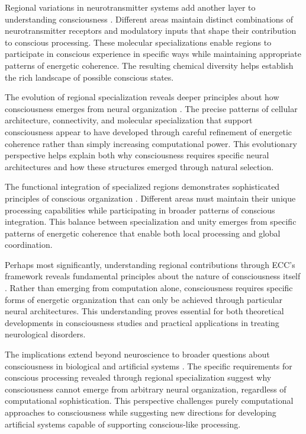 Regional variations in neurotransmitter systems add another layer to understanding consciousness \cite{Tononi2016}. Different areas maintain distinct combinations of neurotransmitter receptors and modulatory inputs that shape their contribution to conscious processing. These molecular specializations enable regions to participate in conscious experience in specific ways while maintaining appropriate patterns of energetic coherence. The resulting chemical diversity helps establish the rich landscape of possible conscious states.

The evolution of regional specialization reveals deeper principles about how consciousness emerges from neural organization \cite{Yu2015}. The precise patterns of cellular architecture, connectivity, and molecular specialization that support consciousness appear to have developed through careful refinement of energetic coherence rather than simply increasing computational power. This evolutionary perspective helps explain both why consciousness requires specific neural architectures and how these structures emerged through natural selection.

The functional integration of specialized regions demonstrates sophisticated principles of conscious organization \cite{Schmahmann2019}. Different areas must maintain their unique processing capabilities while participating in broader patterns of conscious integration. This balance between specialization and unity emerges from specific patterns of energetic coherence that enable both local processing and global coordination.

Perhaps most significantly, understanding regional contributions through ECC's framework reveals fundamental principles about the nature of consciousness itself \cite{Vogt2005}. Rather than emerging from computation alone, consciousness requires specific forms of energetic organization that can only be achieved through particular neural architectures. This understanding proves essential for both theoretical developments in consciousness studies and practical applications in treating neurological disorders.

The implications extend beyond neuroscience to broader questions about consciousness in biological and artificial systems \cite{Tononi2016}. The specific requirements for conscious processing revealed through regional specialization suggest why consciousness cannot emerge from arbitrary neural organization, regardless of computational sophistication. This perspective challenges purely computational approaches to consciousness while suggesting new directions for developing artificial systems capable of supporting conscious-like processing.

